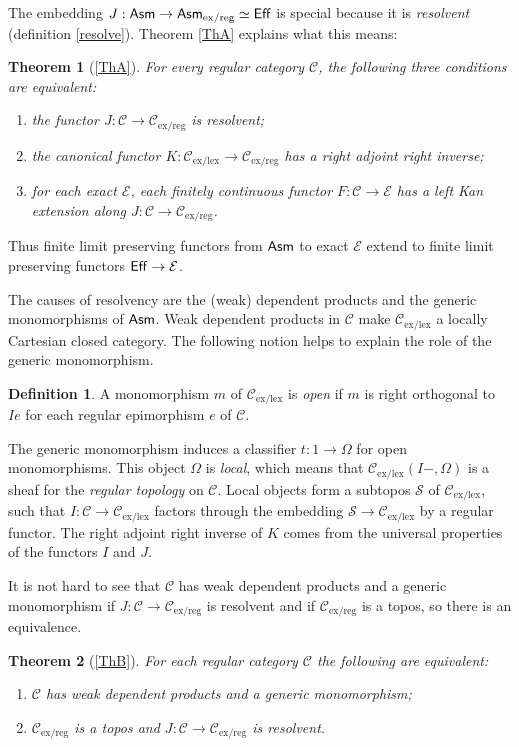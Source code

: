 \documentclass[sort&compress]{elsarticle}
\theoremstyle{plain}
\newtheorem*{theorem*}{Theorem}
\theoremstyle{definition}
\newtheorem{defin}[theorem]{Definition}
\theoremstyle{remark}
\newcommand\cat\mathcal
\newcommand\exlex{_\mathrm{ex/lex}}
\newcommand\exreg{_\mathrm{ex/reg}}
\begin{document}
The embedding $J:\Asm \to \Asm\exreg\simeq \Eff$ is special because it is \emph{resolvent} (definition \ref{resolve}). Theorem \ref{ThA} explains what this means:

\begin{theorem*}[\ref{ThA}]
For every regular category $\cat C$, the following three conditions are equivalent:
\begin{enumerate}[1.]%
\item the functor $J:\cat C \to\cat C\exreg$ is resolvent;
\item the canonical functor $K:\cat C\exlex\to\cat C\exreg$ has a right adjoint right inverse;
\item for each exact $\cat E$, each finitely continuous functor $F:\cat C \to \cat E$ has a left Kan extension along $J:\cat C \to \cat C\exreg$.
\end{enumerate}
\end{theorem*}

Thus finite limit preserving functors from $\mathsf{Asm}$ to exact $\cat E$ extend to finite limit preserving functors $\Eff\to \cat E$.

The causes of resolvency are the (weak) dependent products and the generic monomorphisms of $\mathsf{Asm}$. Weak dependent products in $\cat C$ make $\cat C\exlex$ a locally Cartesian closed category. The following notion helps to explain the role of the generic monomorphism.

\begin{defin} A monomorphism $m$ of $\cat C\exlex$ is \emph{open} if $m$ is right orthogonal to $Ie$ for each regular epimorphism $e$ of $\cat C$.
\end{defin}

The generic monomorphism induces a classifier $t:1\to \Omega$ for open monomorphisms. This object $\Omega$ is \emph{local}, which means that $\cat C\exlex(I-,\Omega)$ is a sheaf for the \emph{regular topology} on $\cat C$. Local objects form a subtopos $\cat S$ of $\cat C\exlex$, %
such that $I:\cat C \to \cat C\exlex$ factors through the embedding $\cat S \to \cat C\exlex$ by a regular functor. The right adjoint right inverse of $K$ comes from the universal properties of the functors $I$ and $J$.

It is not hard to see that $\cat C$ has weak dependent products and a generic monomorphism if $J:\cat C \to \cat C\exreg$ is resolvent and if $\cat C\exreg$ is a topos, so there is an equivalence.

\begin{theorem*}[\ref{ThB}] For each regular category $\cat C$ the following are equivalent:
\begin{enumerate}
\item $\cat C$ has weak dependent products and a generic monomorphism;
\item $\cat C\exreg$ is a topos and $J:\cat C\to\cat C\exreg$ is resolvent.
\end{enumerate}
\end{theorem*}
\end{document}
